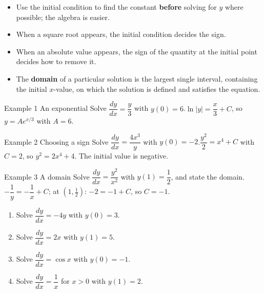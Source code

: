 \documentclass[11pt]{article}
\begin{document}

\begin{ideabox}
\begin{itemize}[leftmargin=*,itemsep=2pt,topsep=2pt]
  \item Use the initial condition to find the constant \textbf{before} solving for $y$ where possible; the algebra is easier.
  \item When a square root appears, the initial condition decides the sign.
  \item When an absolute value appears, the sign of the quantity at the initial point decides how to remove it.
  \item The \textbf{domain} of a particular solution is the largest single interval, containing the initial $x$-value, on which the solution is defined and satisfies the equation.
\end{itemize}
\end{ideabox}

\begin{example}{Example 1 \textperiodcentered{} An exponential}
Solve $\dfrac{dy}{dx}=\dfrac y3$ with $y(0)=6$.\soln $\ln|y|=\dfrac x3+C$, so $y=Ae^{x/3}$ with $A=6$.
\end{example}

\begin{example}{Example 2 \textperiodcentered{} Choosing a sign}
Solve $\dfrac{dy}{dx}=\dfrac{4x^3}{y}$ with $y(0)=-2$.\soln $\dfrac{y^2}{2}=x^4+C$ with $C=2$, so $y^2=2x^4+4$. The initial value is negative.
\end{example}

\begin{example}{Example 3 \textperiodcentered{} A domain}
Solve $\dfrac{dy}{dx}=\dfrac{y^2}{x^2}$ with $y(1)=\dfrac12$, and state the domain.\soln $-\dfrac1y=-\dfrac1x+C$; at $\left(1,\frac12\right)$: $-2=-1+C$, so $C=-1$.
\end{example}

\newpage
{}

\begin{enumerate}[leftmargin=*,itemsep=2pt]
  \item Solve $\dfrac{dy}{dx}=-4y$ with $y(0)=3$.\work{2.3cm}
  \item Solve $\dfrac{dy}{dx}=2x$ with $y(1)=5$.\work{2.3cm}
  \item Solve $\dfrac{dy}{dx}=\cos x$ with $y(0)=-1$.\work{2.3cm}
  \item Solve $\dfrac{dy}{dx}=\dfrac1x$ for $x>0$ with $y(1)=2$.\work{2.3cm}
\end{enumerate}
\end{document}
